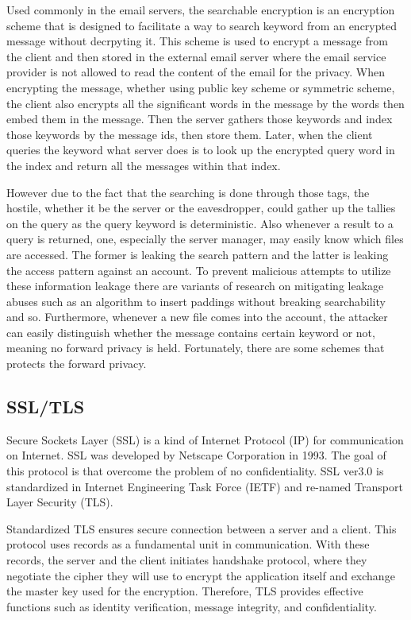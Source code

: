 \documentclass[a4paper]{article}
\begin{document}
Used commonly in the email servers, the searchable encryption is an encryption scheme that is designed to facilitate a way to search keyword from an encrypted message without decrpyting it. This scheme is used to encrypt a message from the client and then stored in the external email server where the email service provider is not allowed to read the content of the email for the privacy. When encrypting the message, whether using public key scheme or symmetric scheme, the client also encrypts all the significant words in the message by the words then embed them in the message. Then the server gathers those keywords and index those keywords by the message ids, then store them. Later, when the client queries the keyword what server does is to look up the encrypted query word in the index and return all the messages within that index.
\par However due to the fact that the searching is done through those tags, the hostile, whether it be the server or the eavesdropper, could gather up the tallies on the query as the query keyword is deterministic. Also whenever a result to a query is returned, one, especially the server manager, may easily know which files are accessed. The former is leaking the search pattern and the latter is leaking the access pattern against an account. To prevent malicious attempts to utilize these information leakage there are variants of research on mitigating leakage abuses such as an algorithm to insert paddings without breaking searchability and so. Furthermore, whenever a new file comes into the account, the attacker can easily distinguish whether the message contains certain keyword or not, meaning no forward privacy is held. Fortunately, there are some schemes that protects the forward privacy.


\subsection{SSL/TLS}
Secure Sockets Layer (SSL) is a kind of Internet Protocol (IP) for communication on Internet. SSL was developed by Netscape Corporation in 1993. The goal of this protocol is that overcome the problem of no confidentiality. SSL ver3.0 is standardized in Internet Engineering Task Force (IETF) and re-named Transport Layer Security (TLS).

Standardized TLS \cite{TLS1, TLS2} ensures secure connection between a server and a client. This protocol uses records as a fundamental unit in communication. With these records, the server and the client initiates handshake protocol, where they negotiate the cipher they will use to encrypt the application itself and exchange the master key used for the encryption. Therefore, TLS provides effective functions such as identity verification, message integrity, and confidentiality.
\end{document}
